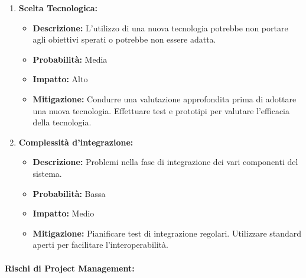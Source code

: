 \begin{enumerate}
    \item \textbf{Scelta Tecnologica:}
          \begin{itemize}
              \item \textbf{Descrizione:} L'utilizzo di una nuova tecnologia potrebbe non portare agli obiettivi sperati o potrebbe non essere adatta.
              \item \textbf{Probabilità:} Media
              \item \textbf{Impatto:} Alto
              \item \textbf{Mitigazione:} Condurre una valutazione approfondita prima di adottare una nuova tecnologia. Effettuare test e prototipi per valutare l'efficacia della tecnologia.
          \end{itemize}

    \item \textbf{Complessità d'integrazione:}
          \begin{itemize}
              \item \textbf{Descrizione:} Problemi nella fase di integrazione dei vari componenti del sistema.
              \item \textbf{Probabilità:} Bassa
              \item \textbf{Impatto:} Medio
              \item \textbf{Mitigazione:} Pianificare test di integrazione regolari. Utilizzare standard aperti per facilitare l'interoperabilità.
          \end{itemize}
\end{enumerate}

\paragraph{Rischi di Project Management:}

